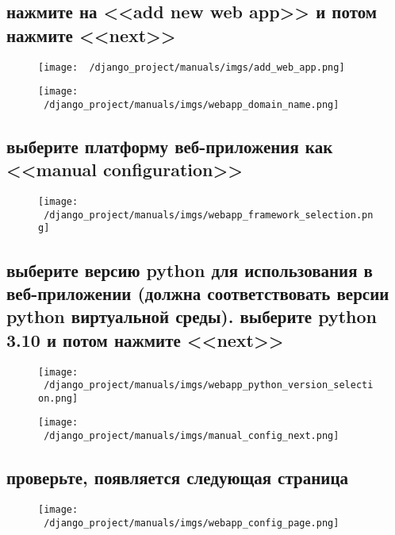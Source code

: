\documentclass[12pt]{article}
\begin{document}
    \subsection{нажмите на <<add new web app>> и потом нажмите <<next>>}
	\begin{figure}[H]
		\centering
		\texttt{[image: ~/django\_project/manuals/imgs/add\_web\_app.png]}
		\caption{}
	\end{figure}
	\begin{figure}[H]
		\centering
		\texttt{[image: ~/django\_project/manuals/imgs/webapp\_domain\_name.png]}
		\caption{}
	\end{figure}

  \subsection{выберите платформу веб-приложения как <<manual configuration>>}
	\begin{figure}[H]
		\centering
		\texttt{[image: ~/django\_project/manuals/imgs/webapp\_framework\_selection.png]}
		\caption{}
	\end{figure}

  \subsection{выберите версию python для использования в веб-приложении (должна соответствовать версии python виртуальной среды). выберите python 3.10 и потом нажмите <<next>>}
	\begin{figure}[H]
		\centering
		\texttt{[image: ~/django\_project/manuals/imgs/webapp\_python\_version\_selection.png]}
		\caption{}
	\end{figure}
	\begin{figure}[H]
		\centering
		\texttt{[image: ~/django\_project/manuals/imgs/manual\_config\_next.png]}
		\caption{}
	\end{figure}

  \subsection{проверьте, появляется следующая страница}
	\begin{figure}[H]
		\centering
		\texttt{[image: ~/django\_project/manuals/imgs/webapp\_config\_page.png]}
		\caption{}
	\end{figure}
\end{document}
